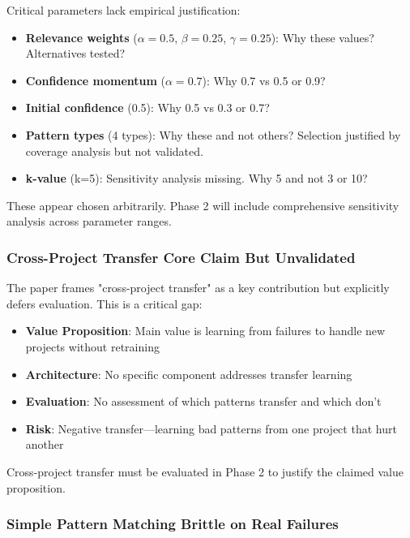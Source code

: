 \documentclass[11pt]{article}
\begin{document}
Critical parameters lack empirical justification:

\begin{itemize}
    \item \textbf{Relevance weights} ($\alpha=0.5$, $\beta=0.25$, $\gamma=0.25$): Why these values? Alternatives tested?
    \item \textbf{Confidence momentum} ($\alpha=0.7$): Why 0.7 vs 0.5 or 0.9?
    \item \textbf{Initial confidence} (0.5): Why 0.5 vs 0.3 or 0.7?
    \item \textbf{Pattern types} (4 types): Why these and not others? Selection justified by coverage analysis but not validated.
    \item \textbf{k-value} (k=5): Sensitivity analysis missing. Why 5 and not 3 or 10?
\end{itemize}

These appear chosen arbitrarily. Phase 2 will include comprehensive sensitivity analysis across parameter ranges.

\subsubsection{Cross-Project Transfer Core Claim But Unvalidated}

The paper frames "cross-project transfer" as a key contribution but explicitly defers evaluation. This is a critical gap:

\begin{itemize}
    \item \textbf{Value Proposition}: Main value is learning from failures to handle new projects without retraining
    \item \textbf{Architecture}: No specific component addresses transfer learning
    \item \textbf{Evaluation}: No assessment of which patterns transfer and which don't
    \item \textbf{Risk}: Negative transfer—learning bad patterns from one project that hurt another
\end{itemize}

Cross-project transfer must be evaluated in Phase 2 to justify the claimed value proposition.

\subsubsection{Simple Pattern Matching Brittle on Real Failures}
\end{document}
